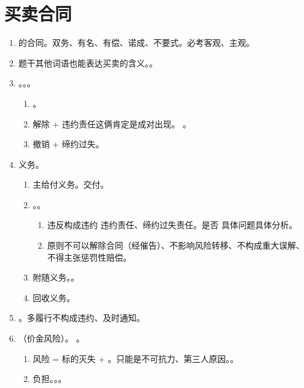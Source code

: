 \section{买卖合同}
\begin{enumerate}
  \item {}的合同。双务、有名、有偿、诺成、不要式。必考客观、主观。
  \item 题干其他词语也能表达买卖的含义。。
  \item {}。。。
        \begin{enumerate}
          \item {}。
          \item 解除 + 违约责任这俩肯定是成对出现。
                。
          \item 撤销 + 缔约过失。
        \end{enumerate}
  \item {}义务。
        \begin{enumerate}
          \item 主给付义务。交付。
          \item {}。。
                \begin{enumerate}
                  \item 违反构成违约 \yjt 违约责任、缔约过失责任。是否 \yjt 具体问题具体分析。
                  \item 原则不可以解除合同（经催告）、不影响风险转移、不构成重大误解、不得主张惩罚性赔偿。
                \end{enumerate}
          \item 附随义务。。
          \item 回收义务。
        \end{enumerate}
  \item {}。多履行不构成违约、及时通知。
  \item {}（价金风险）。 \yjt {}。
        \begin{enumerate}
          \item 风险 = 标的灭失 + 。只能是不可抗力、第三人原因。。
          \item 负担。。。

\end{enumerate}
\end{enumerate}
